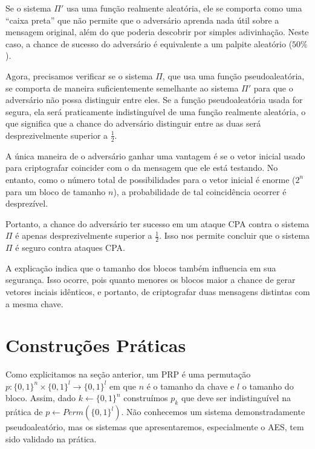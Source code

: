 Se o sistema $\Pi'$ usa uma função realmente aleatória, ele se comporta como uma ``caixa preta'' que não permite que o adversário aprenda nada útil sobre a mensagem original, além do que poderia descobrir por simples adivinhação.
Neste caso, a chance de sucesso do adversário é equivalente a um palpite aleatório ($50\%$).

Agora, precisamos verificar se o sistema $\Pi$, que usa uma função pseudoaleatória, se comporta de maneira suficientemente semelhante ao sistema $\Pi'$ para que o adversário não possa distinguir entre eles.
Se a função pseudoaleatória usada for segura, ela será praticamente indistinguível de uma função realmente aleatória, o que significa que a chance do adversário distinguir entre as duas será desprezivelmente superior a $\frac{1}{2}$.

A única maneira de o adversário ganhar uma vantagem é se o vetor inicial usado para criptografar coincider com o da mensagem que ele está testando.
No entanto, como o número total de possibilidades para o vetor inicial é enorme ($2^n$ para um bloco de tamanho $n$), a probabilidade de tal coincidência ocorrer é desprezível.

Portanto, a chance do adversário ter sucesso em um ataque CPA contra o sistema $\Pi$ é apenas desprezivelmente superior a $\frac{1}{2}$.
Isso nos permite concluir que o sistema $\Pi$ é seguro contra ataques CPA.

A explicação indica que o tamanho dos blocos também influencia em sua segurança.
Isso ocorre, pois quanto menores os blocos maior a chance de gerar vetores inciais idênticos, e portanto, de criptografar duas mensagens distintas com a mesma chave.

\section{Construções Práticas}
\label{sec:construcoes-praticas}
Como explicitamos na seção anterior, um PRP é uma permutação $p: \{0,1\}^n \times \{0,1\}^l \to \{0,1\}^l$ em que $n$ é o tamanho da chave e $l$ o tamanho do bloco.
Assim, dado $k \leftarrow \{0,1\}^n$ construímos $p_k$ que deve ser indistinguível na prática de $p \leftarrow Perm(\{0,1\}^l)$.
Não conhecemos um sistema demonstradamente pseudoaleatório, mas os sistemas que apresentaremos, especialmente o AES, tem sido validado na prática.

